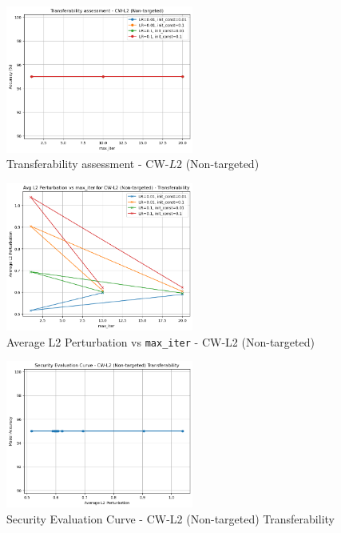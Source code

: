             \begin{figure}[H]
                \centering
                \includegraphics[width=0.55\textwidth]{images/cwtrasuntargl2.png}
                \caption{Transferability assessment - CW-$L2$ (Non-targeted)}
                \label{fig:cwnt_transf_success}
            \end{figure}
            
            \begin{figure}[H]
                \centering
                \includegraphics[width=0.55\textwidth]{images/cwtrasuntargl2-1.png}
                \caption{Average L2 Perturbation vs \texttt{max\_iter} - CW-L2 (Non-targeted)}
                \label{fig:cwnt_transf_perturb}
            \end{figure}
            
            \begin{figure}[H]
                \centering
                \includegraphics[width=0.55\textwidth]{images/cwtrasuntargl2sec.png}
                \caption{Security Evaluation Curve - CW-L2 (Non-targeted) Transferability}
                \label{fig:cwnt_transf_sec}
            \end{figure}
            
